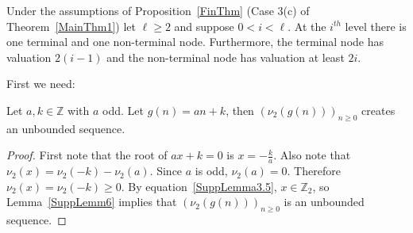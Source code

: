 \documentclass[12pt]{article}
\begin{document}
\begin{lemma}\label{FinLem2}
Under the assumptions of Proposition~\ref{FinThm} (Case 3(c) of Theorem~\ref{MainThm1}) let $\ell\geq 2$ and suppose $0<i<\ell$.
At the $i^{th}$ level there is one terminal and one non-terminal node. Furthermore, the terminal node has valuation $2(i-1)$ and the non-terminal node has valuation at least $2i$.
\end{lemma}

First we need:
\begin{claim}\label{SuppLemm7}
Let $a,k\in\mathbb{Z}$ with $a$ odd. Let $g(n)=an+k$, then $(\nu_{2}(g(n)))_{n\geq0}$ creates an unbounded sequence.
\end{claim}
\begin{proof}
First note that the root of $ax+k=0$ is $x=-\frac{k}{a}$. Also note that $\nu_{2}(x)=\nu_{2}(-k)-\nu_{2}(a)$. Since $a$ is odd, $\nu_{2}(a)=0$. Therefore $\nu_{2}(x)=\nu_{2}(-k)\geq0$. By equation~\eqref{SuppLemma3.5}, $x\in\mathbb{Z}_{2}$, so Lemma~\ref{SuppLemm6} implies that $(\nu_{2}(g(n)))_{n\geq0}$ is an unbounded sequence.
\end{proof}
\end{document}
